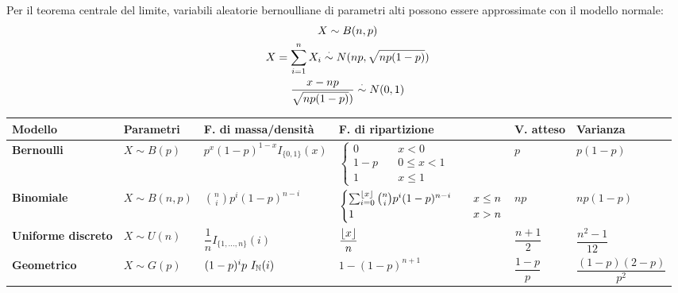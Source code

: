 Per il teorema centrale del limite, variabili aleatorie bernoulliane di parametri alti possono essere approssimate con il modello normale:
\begin{gather*}
	X\sim B(n,p) \\
	X = \sum_{i=1}^n X_i \overset{\cdot}{\sim} N(np, \sqrt{np(1-p)}) \\
	\frac{x-np}{\sqrt{np(1-p)})} \overset{\cdot}{\sim} N(0,1)
\end{gather*}



\begin{sidewaystable}
	\centering
	\begin{tabular}{llllll}
		\toprule
		\bfseries Modello           & \bfseries Parametri   & \bfseries F. di massa/densità                                    & \bfseries F. di ripartizione                                                                               & \bfseries V. atteso & \bfseries Varianza         \\
		\midrule
		\bfseries Bernoulli         & $X\sim B(p)$          & $p^x(1-p)^{1-x}I_{\{0,1\}}(x)$                                   & $\begin{cases}0\quad & x<0\\1-p\quad & 0\leq x<1\\1\quad & x\leq 1\end{cases}$                                                                              & $p$                 & $p(1-p)$                   \\[5ex]
		\bfseries Binomiale         & $X\sim B(n,p)$        & $\displaystyle\binom{n}{i} p^i(1-p)^{n-i}$                       & $\begin{cases}\sum_{i=0}^{\left\lfloor x \right\rfloor}\binom{n}{i} p^i (1-p)^{n-i}\quad & x\leq n \\1 & x>n \end{cases}$                                                                              & $np$                & $np(1-p)$                  \\[3ex]
		\bfseries Uniforme discreto & $X\sim U(n)$          & $\dfrac{1}{n} I_{\{1,\dots,n\}}(i)$                              & $\dfrac{\left\lfloor x \right\rfloor}{n}$                                                                                     & $\dfrac{n+1}{2}$    & $\dfrac{n^2-1}{12}$        \\[2ex]
		\bfseries Geometrico        & $X\sim G(p)$          & $(1-p)^ip ~ I_\mathbb N (i)$                                            & $1 - (1-p)^{n+1}  $                                                                                        & $ \dfrac{1-p}{p}$   & $ \dfrac{(1-p)(2-p)}{p^2}$ \\[1ex]

\end{tabular}
\end{sidewaystable}
